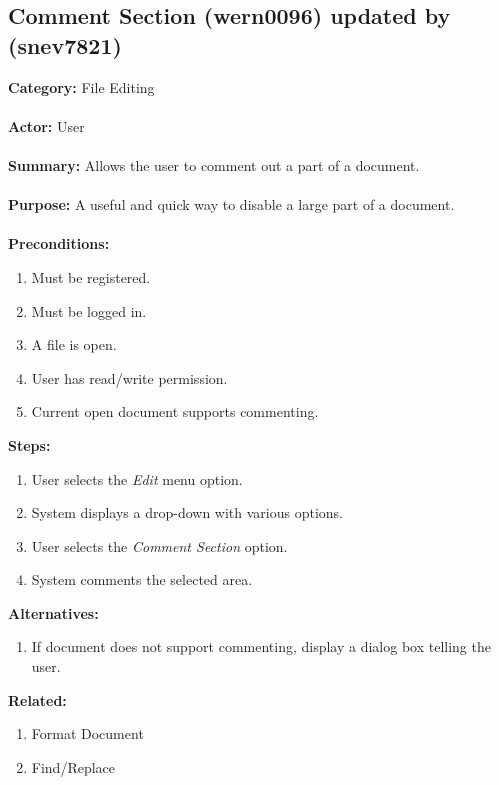 \documentclass[11pt]{report}
\begin{document}
\newpage

\subsection{Comment Section (wern0096) updated by (snev7821)}
\begin{framed}

	\textbf{Category:} File Editing \\ \\
	\textbf{Actor:} User \\ \\
	\textbf{Summary:} Allows the user to comment out a part of a document. \\ \\
	\textbf{Purpose:} A useful and quick way to disable a large part of a document. \\ \\
	\textbf{Preconditions:} 
	\begin{enumerate}
		\item Must be registered.
		\item Must be logged in.
		\item A file is open.
		\item User has read/write permission.
		\item Current open document supports commenting.
	\end{enumerate}
	\textbf{Steps:}
	\begin{enumerate}
		\item User selects the \textit{Edit} menu option.
		\item System displays a drop-down with various options.
		\item User selects the \textit{Comment Section} option.
		\item System comments the selected area.
	\end{enumerate}
	\textbf{Alternatives:}
	\begin{enumerate}
		\item If document does not support commenting, display a dialog box telling the user.
	\end{enumerate}
	\textbf{Related:}
	\begin{enumerate}
		\item Format Document
		\item Find/Replace
	\end{enumerate}
\end{framed}

\newpage
\end{document}
